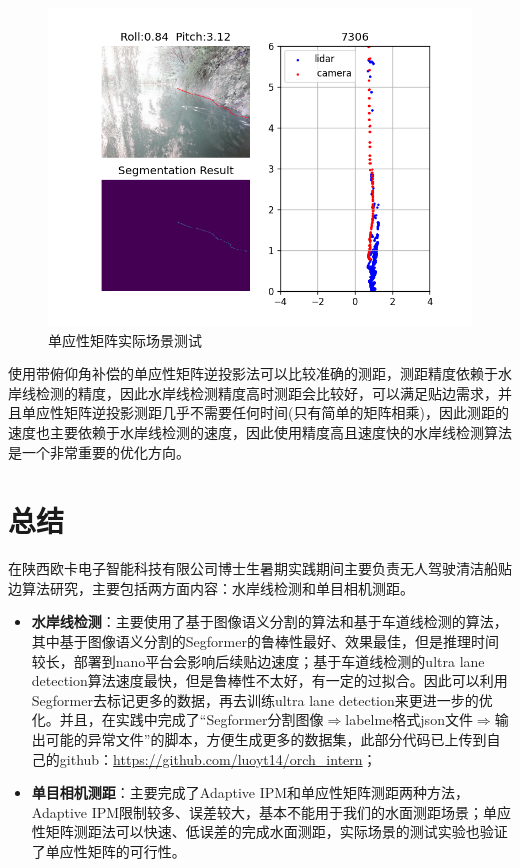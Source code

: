 \documentclass[cn,12pt,color=mine,scheme=chinese,bibstyle=gb7714-2015]{elegantbook}
\begin{document}
\begin{figure}[h]
	\centering
	\includegraphics[width=.8\linewidth]{images/dist}
	\caption{单应性矩阵实际场景测试}
	\label{dist}
\end{figure}

\begin{conclusion}
	使用带俯仰角补偿的单应性矩阵逆投影法可以比较准确的测距，测距精度依赖于水岸线检测的精度，因此水岸线检测精度高时测距会比较好，可以满足贴边需求，并且单应性矩阵逆投影测距几乎不需要任何时间(只有简单的矩阵相乘)，因此测距的速度也主要依赖于水岸线检测的速度，因此使用精度高且速度快的水岸线检测算法是一个非常重要的优化方向。
\end{conclusion}

\chapter{总结}
在陕西欧卡电子智能科技有限公司博士生暑期实践期间主要负责无人驾驶清洁船贴边算法研究，主要包括两方面内容：水岸线检测和单目相机测距。
\begin{itemize}
	\item \textbf{水岸线检测}：主要使用了基于图像语义分割的算法和基于车道线检测的算法，其中基于图像语义分割的Segformer的鲁棒性最好、效果最佳，但是推理时间较长，部署到nano平台会影响后续贴边速度；基于车道线检测的ultra lane detection算法速度最快，但是鲁棒性不太好，有一定的过拟合。因此可以利用Segformer去标记更多的数据，再去训练ultra lane detection来更进一步的优化。并且，在实践中完成了“Segformer分割图像$\Longrightarrow$labelme格式json文件$\Longrightarrow$输出可能的异常文件”的脚本，方便生成更多的数据集，此部分代码已上传到自己的github：\url{https://github.com/luoyt14/orch_intern}；
	\item \textbf{单目相机测距}：主要完成了Adaptive IPM和单应性矩阵测距两种方法，Adaptive IPM限制较多、误差较大，基本不能用于我们的水面测距场景；单应性矩阵测距法可以快速、低误差的完成水面测距，实际场景的测试实验也验证了单应性矩阵的可行性。
\end{itemize}
\end{document}
